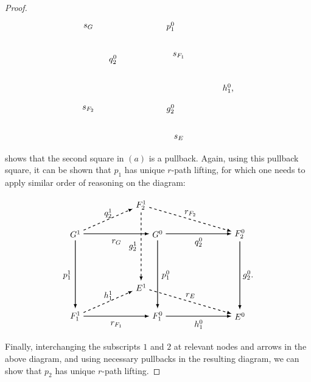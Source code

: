 \documentclass[a4paper,reqno,12pt]{amsart}
\theoremstyle{definition}
\theoremstyle{remark}
\begin{document}
\begin{proof}
\[\begin{tikzpicture}[scale=1.7]
\node at (3,-0.2) {$s_{F_1}$};
\node at (3,-2.2) {$s_E$};
\node at (4.2,-1) {$h_1^0$,};

\node at (0.8,0.5) {$s_G$};
\node at (0.8,-1.5) {$s_{F_2}$};
\node at (2.8,0.5) {$p_1^0$};
\node at (2.8,-1.5) {$g_2^0$};

\node at (1.4,-0.3) {$q_2^0$};

\end{tikzpicture}
\] shows that the second square in $(a)$ is a pullback. Again, using this pullback square, it can be shown that $p_1$ has unique $r$-path lifting, for which one needs to apply similar order of reasoning on the diagram:

\[
\begin{tikzpicture}[scale=1.7]
\node[] (A1) at (0,0) {$G^1$};
\node[] (A2) at (2,0) {$G^0$};
\node[] (A3) at (0,-2) {$F_1^1$};
\node[] (A4) at (2,-2) {$F_1^0$};

\node[] (B1) at (1.6,0.7) {$F_2^1$};
\node[] (B2) at (4,0) {$F_2^0$};
\node[] (B3) at (1.6,-1.3) {$E^1$};
\node[] (B4) at (4,-2) {$E^0$};

\path[->, black, >=latex,thick] (A1) edge [] node[]{} (A2);
\path[->, black, >=latex,thick] (A3) edge [] node[]{} (A4);
\path[->, black, >=latex,thick] (A1) edge [] node[]{} (A3);
\path[->, black, >=latex,thick] (A2) edge [] node[]{} (A4);

\path[->,black, dashed, >=latex,thick] (B1) edge [] node[]{} (B3);
\path[->,black, >=latex,thick] (A4) edge [] node[]{} (B4);
\path[->,black, >=latex,thick] (A2) edge [] node[]{} (B2);
\path[->,black, >=latex,thick] (B2) edge [] node[]{} (B4);

\path[->,black, dashed, >=latex,thick] (A1) edge [] node {} (B1);
\path[->,black, dashed, >=latex,thick] (A3) edge [] node {} (B3);
\path[->,black, dashed, >=latex,thick] (B1) edge [] node {} (B2);
\path[->,black, dashed, >=latex,thick] (B3) edge [] node {} (B4);

\node at (1,-0.2) {$r_G$};
\node at (1,-2.2) {$r_{F_1}$};
\node at (-0.2,-1) {$p_1^1$};
\node at (2.2,-1) {$p_1^0$};

\node at (3,-0.2) {$q_2^0$};
\node at (3,-2.2) {$h_1^0$};
\node at (4.2,-1) {$g_2^0$.};

\node at (0.8,0.5) {$q_2^1$};
\node at (0.8,-1.5) {$h_1^1$};
\node at (2.8,0.5) {$r_{F_2}$};
\node at (2.8,-1.5) {$r_E$};

\node at (1.4,-0.3) {$g_2^1$};

\end{tikzpicture}
\] Finally, interchanging the subscripts $1$ and $2$ at relevant nodes and arrows in the above diagram, and using necessary pullbacks in the resulting diagram, we can show that $p_2$ has unique $r$-path lifting. 
\end{proof}
\end{document}

